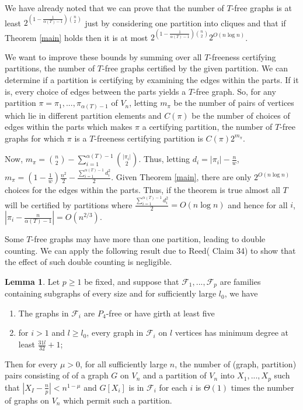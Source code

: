 \documentclass[12pt]{article}
\theoremstyle{definition}
\newtheorem{lemma}[theorem]{Lemma}
\begin{document}
We have already noted that we can prove that the number of $T$-free graphs is at least $2^{(1-\frac{1}{\alpha(T)-1}){n \choose 2}}$
just by considering one partition into cliques and that if Theorem \ref{main} holds then it is at most 
$2^{(1-\frac{1}{\alpha(T)-1}){n \choose 2}}2^{O(n \log n)}$. 

We want to   improve these bounds  by summing over all  $T$-freeness certifying partitions,  the number of $T$-free graphs certified by the given partition. We can determine if a partition is certifying by examining the edges within the parts. 
If it is, every choice of edges between the parts yields a $T$-free graph. 
So, for  any partition $\pi= \pi_1,...,\pi_{\alpha(T)-1}$ of $V_n$, letting $m_\pi$ be the number of pairs of vertices which lie in different partition elements and $C(\pi)$ be the number of choices of edges within the parts which makes $\pi$ a certifying partition,
the number of $T$-free graphs for which $\pi$ is a $T$-freeness certifying partition is $C(\pi)2^{m_\pi}$. 

Now,  $m_\pi={n \choose 2}-\sum_{i=1}^{\alpha(T)-1} {|\pi_i| \choose 2}$. Thus, letting $d_i=|\pi_i|-\frac{n}{w}$,
$m_\pi=(1- \frac{1}{w})\frac{n^2}{2} -\frac{\sum_{i=1}^{\alpha(T)-1} d^2_i}{2}$. Given Theorem \ref{main}, 
there are only $2^{O(n \log n)}$ choices for the edges within the parts. Thus, if the theorem is true 
almost all $T$ will be certified by partitions where $\frac{\sum_{i=1}^{\alpha(T)-1} d^2_i}{2} =O (n \log n)$
and hence for all $i$, $|\pi_i-\frac{n}{\alpha(T)-1}| =O(n^{2/3})$. 









Some $T$-free graphs may have more than one partition, leading to double counting.
We can apply the following result  due to Reed(\cite{R} Claim 34) to show that the effect of such double counting is negligible. 


\begin{lemma} 
\label{nodoublecount}
Let $p\ge1$ be fixed, and suppose that ${\mathcal F}_1,...,{\mathcal F}_p$ 
are families containing subgraphs of every size and  for sufficiently large $l_0$,  we have 
\begin{enumerate}
\item  The  graphs  in  
${\mathcal F}_i$  are $P_4$-free or have girth at least five 
\item 
for $i>1$ and $l\ge l_0$, every graph in ${\mathcal F}_i$ on $l$ vertices  has minimum degree at least $\frac{31l}{32}+1$;
\end{enumerate}
Then  
for every $\mu>0$, for  all sufficiently large $n$, the number of (graph, partition) pairs consisting of  
of a graph $G$ on $V_n$  and a partition of $V_n$ into  $X_1,...,X_p$ such that $|X_I-\frac{n}{p}|<n^{1-\mu}$ and  $G[X_i]$ is in ${\mathcal F}_i$ 
 for each $i$ is $\Theta(1)$ times the number of graphs on $V_n$ which  permit such a partition. 
\end{lemma}
\end{document}
